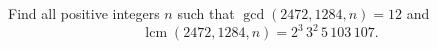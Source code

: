 Find all positive integers $n$ such that $\gcd(2472,1284,n)=12$ and
\[
\operatorname{lcm}(2472,1284,n)=2^3\,3^2\,5\,103\,107.
\]
